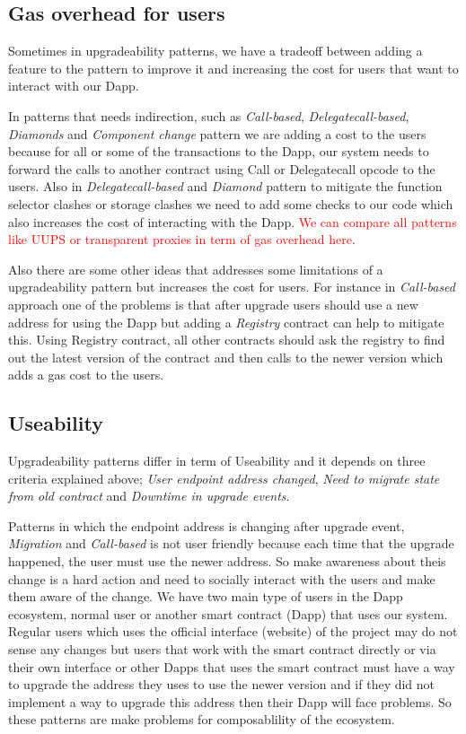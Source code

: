 \subsection{Gas overhead for users}
Sometimes in upgradeability patterns, we have a tradeoff between adding a feature to the pattern to improve it and increasing the cost for users that want to interact with our Dapp.

In patterns that needs indirection, such as \textit{Call-based}, \textit{Delegatecall-based}, \textit{Diamonds} and \textit{Component change} pattern we are adding a cost to the users because for all or some of the transactions to the Dapp, our system needs to forward the calls to another contract using Call or Delegatecall opcode to the users. 
Also in \textit{Delegatecall-based} and \textit{Diamond} pattern to mitigate the function selector clashes or storage clashes we need to add some checks to our code which also increases the cost of interacting with the Dapp. \textcolor{red}{We can compare all patterns like UUPS or transparent proxies in term of gas overhead here}.

Also there are some other ideas that addresses some limitations of a upgradeability pattern but increases the cost for users. For instance in \textit{Call-based} approach one of the problems is that after upgrade users should use a new address for using the Dapp but adding a \emph{Registry} contract can help to mitigate this. Using Registry contract, all other contracts should ask the registry to find out the latest version of the contract and then calls to the newer version which adds a gas cost to the users. 

 
 \subsection{Useability}
 Upgradeability patterns differ in term of Useability and it depends on three criteria explained above; \textit{User endpoint address changed}, \textit{Need to migrate state from old contract} and \textit{Downtime in upgrade events}.

Patterns in which the endpoint address is changing after upgrade event, \textit{Migration} and \textit{Call-based} is not user friendly because each time that the upgrade happened, the user must use the newer address. So make awareness about theis change is a hard action and need to socially interact with the users and make them aware of the change. We have two main type of users in the Dapp ecosystem, normal user or another smart contract (Dapp) that uses our system. Regular users which uses the official interface (website) of the project may do not sense any changes but users that work with the smart contract directly or via their own interface or other Dapps that uses the smart contract must have a way to upgrade the address they uses to use the newer version and if they did not implement a way to upgrade this address then their Dapp will face problems. So these patterns are make problems for composablility of the ecosystem.

